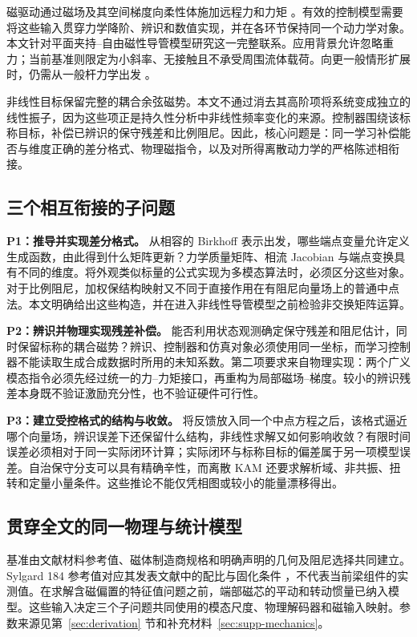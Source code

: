 磁驱动通过磁场及其空间梯度向柔性体施加远程力和力矩 \citep{abbott,kim}。有效的控制模型需要将这些输入贯穿力学降阶、辨识和数值实现，并在各环节保持同一个动力学对象。本文针对平面夹持--自由磁性导管模型研究这一完整联系。应用背景允许忽略重力；当前基准则限定为小斜率、无接触且不承受周围流体载荷。向更一般情形扩展时，仍需从一般杆力学出发 \citep{simo,antman}。

非线性目标保留完整的耦合余弦磁势。本文不通过消去其高阶项将系统变成独立的线性振子，因为这些项正是持久性分析中非线性频率变化的来源。控制器围绕该标称目标，补偿已辨识的保守残差和比例阻尼。因此，核心问题是：同一学习补偿能否与维度正确的差分格式、物理磁指令，以及对所得离散动力学的严格陈述相衔接。

\subsection{三个相互衔接的子问题}
\label{fw:three-questions}
\textbf{P1：推导并实现差分格式。} 从相容的 Birkhoff 表示出发，哪些端点变量允许定义生成函数，由此得到什么矩阵更新？力学质量矩阵、相流 Jacobian 与端点变换具有不同的维度。将外观类似标量的公式实现为多模态算法时，必须区分这些对象。对于比例阻尼，加权保结构映射又不同于直接作用在有阻尼向量场上的普通中点法。本文明确给出这些构造，并在进入非线性导管模型之前检验非交换矩阵运算。

\textbf{P2：辨识并物理实现残差补偿。} 能否利用状态观测确定保守残差和阻尼估计，同时保留标称的耦合磁势？辨识、控制器和仿真对象必须使用同一坐标，而学习控制器不能读取生成合成数据时所用的未知系数。第二项要求来自物理实现：两个广义模态指令必须先经过统一的力--力矩接口，再重构为局部磁场--梯度。较小的辨识残差本身既不验证激励充分性，也不验证硬件可行性。

\textbf{P3：建立受控格式的结构与收敛。} 将反馈放入同一个中点方程之后，该格式逼近哪个向量场，辨识误差下还保留什么结构，非线性求解又如何影响收敛？有限时间误差必须相对于同一实际闭环计算；实际闭环与标称目标的偏差属于另一项模型误差。自治保守分支可以具有精确辛性，而离散 KAM 还要求解析域、非共振、扭转和定量小量条件。这些推论不能仅凭相图或较小的能量漂移得出。

\subsection{贯穿全文的同一物理与统计模型}
基准由文献材料参考值、磁体制造商规格和明确声明的几何及阻尼选择共同建立。Sylgard 184 参考值对应其发表文献中的配比与固化条件 \citep{cho2021pdms}，不代表当前梁组件的实测值。在求解含磁偏置的特征值问题之前，端部磁芯的平动和转动惯量已纳入模型。这些输入决定三个子问题共同使用的模态尺度、物理解码器和磁输入映射。参数来源见第~\ref{sec:derivation} 节和补充材料~\ref{sec:supp-mechanics}。

